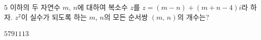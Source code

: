 $5$ 이하의 두 자연수 $m$, $n$에 대하여 복소수 $z$를 $z=(m-n)+(m+n-4)i$라 하자. $z^2$이 실수가 되도록 하는 $m$, $n$의 모든 순서쌍 $(m,\,n)$의 개수는? 
\begin{choices32}{$5$}{$7$}{$9$}{$11$}{$13$}\end{choices32}
